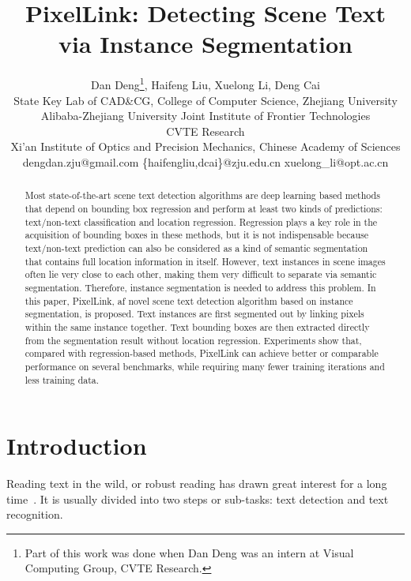 \documentclass[letterpaper]{article} \usepackage{aaai18}  \usepackage{times}  \usepackage{helvet}  \usepackage{courier}  \usepackage{url}  \usepackage{graphicx}
\begin{document}
\title{PixelLink: Detecting Scene Text via Instance Segmentation}
	\author{Dan Deng\thanks{Part of this work was done when Dan Deng was an intern at Visual Computing Group, CVTE Research.}, \quad Haifeng Liu, \quad Xuelong Li, \quad Deng Cai \\
		State Key Lab of CAD\&CG, College of Computer Science, Zhejiang University\\
		Alibaba-Zhejiang University Joint Institute of Frontier Technologies\\
		CVTE Research\\
		Xi'an Institute of Optics and Precision Mechanics, Chinese Academy of Sciences \\
		dengdan.zju@gmail.com \quad  \{haifengliu,dcai\}@zju.edu.cn \quad  xuelong\_li@opt.ac.cn\\
	}
	\maketitle
	\begin{abstract}
		Most state-of-the-art scene text detection algorithms are deep learning based methods that depend on bounding box regression and perform at least two kinds of predictions: text/non-text classification and location regression. Regression plays a key role in the acquisition of bounding boxes in these methods, but it is not indispensable because text/non-text prediction can also be considered as a kind of semantic segmentation that contains full location information in itself. However, text instances in scene images often lie very close to each other, making them very difficult to separate via semantic segmentation. Therefore, instance segmentation is needed to address this problem. In this paper, PixelLink, aƒ novel scene text detection algorithm based on instance segmentation, is proposed. Text instances are first segmented out by linking pixels within the same instance together. Text bounding boxes are then extracted directly from the segmentation result without location regression. Experiments show that, compared with regression-based methods, PixelLink can achieve better or comparable performance on several benchmarks, while requiring many fewer training iterations and less training data.
	\end{abstract}
	
	\section{Introduction}
Reading text in the wild, or robust reading has drawn great interest for a long time~\cite{Ye2015Survey}. It is usually divided into two steps or sub-tasks: text detection and text recognition.
	
\end{document}
